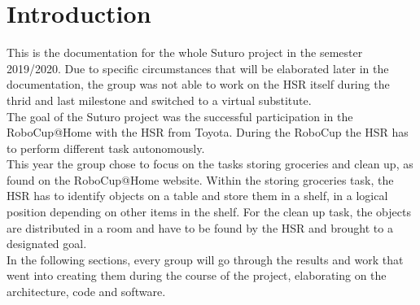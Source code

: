 \documentclass[main.tex]{subfiles}
\begin{document}
	\chapter{Introduction}

This is the documentation for the whole Suturo project in the semester 2019/2020. Due to specific circumstances that will be elaborated later in the documentation, the group was not able to work on the HSR itself during the thrid and last milestone and switched to a virtual substitute.\\
	The goal of the Suturo project was the successful participation in the RoboCup@Home with the HSR from Toyota. During the RoboCup the HSR has to perform different task autonomously.\\ 
	This year the group chose to focus on the tasks storing groceries and clean up, as found on the RoboCup@Home website. Within the storing groceries task, the HSR has to identify objects on a table and store them in a shelf, in a logical position depending on other items in the shelf. For the clean up task, the objects are distributed in a room and have to be found by the HSR and brought to a designated goal.\\
	In the following sections, every group will go through the results and work that went into creating them during the course of the project, elaborating on the architecture, code and software.\\
	
\end{document}
